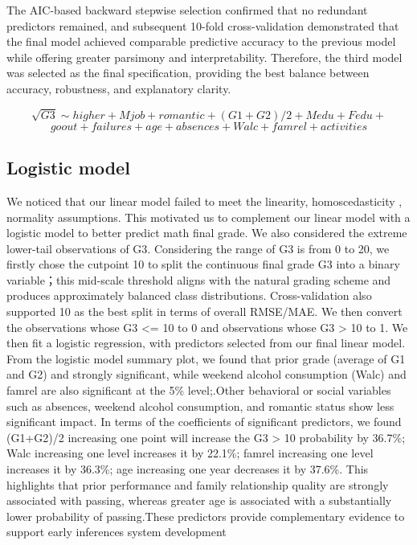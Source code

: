 \documentclass[9pt,twocolumn,twoside,]{pinp}
\begin{document}
The AIC-based backward stepwise selection confirmed that no redundant
predictors remained, and subsequent 10-fold cross-validation
demonstrated that the final model achieved comparable predictive
accuracy to the previous model while offering greater parsimony and
interpretability. Therefore, the third model was selected as the final
specification, providing the best balance between accuracy, robustness,
and explanatory clarity.

\[\sqrt{G3} \sim higher + Mjob + romantic + (G1 + G2)/2 + Medu + Fedu + \]
\[goout+ failures + age + absences + Walc + famrel + activities\]

\subsection{\texorpdfstring{\textbf{Logistic
model}}{Logistic model}}\label{logistic-model}

We noticed that our linear model failed to meet the linearity,
homoscedasticity , normality assumptions. This motivated us to
complement our linear model with a logistic model to better predict math
final grade. We also considered the extreme lower-tail observations of
G3. Considering the range of G3 is from 0 to 20, we firstly chose the
cutpoint 10 to split the continuous final grade G3 into a binary
variable；this mid-scale threshold aligns with the natural grading
scheme and produces approximately balanced class distributions.
Cross-validation also supported 10 as the best split in terms of overall
RMSE/MAE. We then convert the observations whose G3 \textless= 10 to 0
and observations whose G3 \textgreater{} 10 to 1. We then fit a logistic
regression, with predictors selected from our final linear model. From
the logistic model summary plot, we found that prior grade (average of
G1 and G2) and strongly significant, while weekend alcohol consumption
(Walc) and famrel are also significant at the 5\% level;.Other
behavioral or social variables such as absences, weekend alcohol
consumption, and romantic status show less significant impact. In terms
of the coefficients of significant predictors, we found (G1+G2)/2
increasing one point will increase the G3 \textgreater{} 10 probability
by 36.7\%; Walc increasing one level increases it by 22.1\%; famrel
increasing one level increases it by 36.3\%; age increasing one year
decreases it by 37.6\%. This highlights that prior performance and
family relationship quality are strongly associated with passing,
whereas greater age is associated with a substantially lower probability
of passing.These predictors provide complementary evidence to support
early inferences system development
\end{document}
